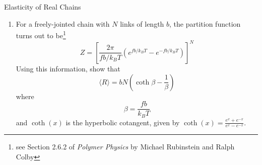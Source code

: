 \begin{activity}[extension]{Elasticity of Real Chains}
\begin{exercises}
\begin{enumerate}
\begin{solution}{}
				Next, take the derivative of $G$ with respect to $f$:
				\begin{equation*}
					\frac{\partial G}{\partial f} = k_B T \frac{1}{Z} \frac{\partial Z}{\partial F}
				\end{equation*}
				Substituting in our expression for $\frac{\partial Z}{\partial f}$ from above and simplifying, we obtain
				\begin{align*}
					\frac{\partial G}{\partial f} &= k_B T \frac{1}{Z} \left( -\frac{1}{k_B T}\sum_\text{all states}R e^{-\frac{fR}{k_B T}} \right) \\
					&= -\frac{1}{Z}\sum_{all states} R e^{-\frac{fR}{k_B T}}\\
					&= -\langle R \rangle
				\end{align*}
				Thus, $\langle R \rangle = -\frac{\partial G}{\partial f}$ as desired.
			\end{solution}
			
		\item For a freely-jointed chain with $N$ links of length $b$, the partition function turns out to be\footnote{see Section 2.6.2 of \emph{Polymer Physics} by Michael Rubinstein and Ralph Colby}
		\begin{equation*}
			Z = \left[ \frac{2\pi}{fb/k_B T}\left(e^{fb/k_B T} - e^{-fb/k_B T}\right)\right]^N
		\end{equation*}
		Using this information, show that
		\begin{equation*}
			\langle R \rangle = bN\left(\coth \beta - \frac{1}{\beta}\right)
		\end{equation*}
		where
		\begin{equation*}
			\beta = \frac{fb}{k_B T}
		\end{equation*}
		and $\coth(x)$ is the hyperbolic cotangent, given by $\coth(x) = \frac{e^x + e^{-x}}{e^x - e^{-x}}$.
		

\end{enumerate}
\end{exercises}
\end{activity}
